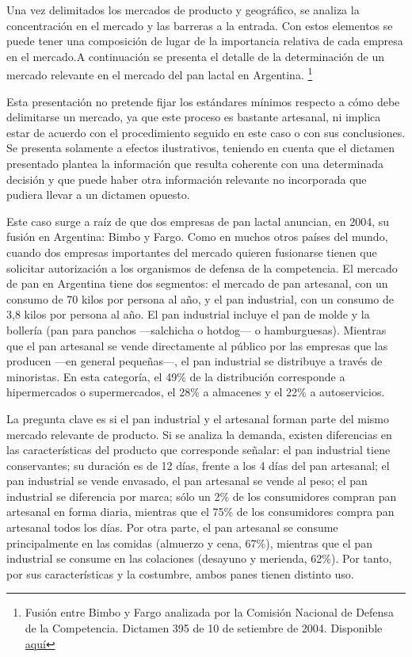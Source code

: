 \documentclass[
  12pt,
  spanish,
]{book}
\begin{document}
Una vez delimitados los mercados de producto y geográfico, se analiza la
concentración en el mercado y las barreras a la entrada. Con estos
elementos se puede tener una composición de lugar de la importancia
relativa de cada empresa en el mercado.A continuación se presenta el
detalle de la determinación de un mercado relevante en el mercado del
pan lactal en Argentina. \footnote{Fusión entre Bimbo y Fargo analizada
  por la Comisión Nacional de Defensa de la Competencia. Dictamen 395 de
  10 de setiembre de 2004. Disponible
  \href{http://cndc.produccion.gob.ar/sites/default/files/cndcfiles/395_0.pdf}{aquí}}

Esta presentación no pretende fijar los estándares mínimos respecto a
cómo debe delimitarse un mercado, ya que este proceso es bastante
artesanal, ni implica estar de acuerdo con el procedimiento seguido en
este caso o con sus conclusiones. Se presenta solamente a efectos
ilustrativos, teniendo en cuenta que el dictamen presentado plantea la
información que resulta coherente con una determinada decisión y que
puede haber otra información relevante no incorporada que pudiera llevar
a un dictamen opuesto.

Este caso surge a raíz de que dos empresas de pan lactal anuncian, en
2004, su fusión en Argentina: Bimbo y Fargo. Como en muchos otros países
del mundo, cuando dos empresas importantes del mercado quieren
fusionarse tienen que solicitar autorización a los organismos de defensa
de la competencia. El mercado de pan en Argentina tiene dos segmentos:
el mercado de pan artesanal, con un consumo de 70 kilos por persona al
año, y el pan industrial, con un consumo de 3,8 kilos por persona al
año. El pan industrial incluye el pan de molde y la bollería (pan para
panchos ---salchicha o hotdog--- o hamburguesas). Mientras que el pan
artesanal se vende directamente al público por las empresas que las
producen ---en general pequeñas---, el pan industrial se distribuye a
través de minoristas. En esta categoría, el 49\% de la distribución
corresponde a hipermercados o supermercados, el 28\% a almacenes y el
22\% a autoservicios.

La pregunta clave es si el pan industrial y el artesanal forman parte
del mismo mercado relevante de producto. Si se analiza la demanda,
existen diferencias en las características del producto que corresponde
señalar: el pan industrial tiene conservantes; su duración es de 12
días, frente a los 4 días del pan artesanal; el pan industrial se vende
envasado, el pan artesanal se vende al peso; el pan industrial se
diferencia por marca; sólo un 2\% de los consumidores compran pan
artesanal en forma diaria, mientras que el 75\% de los consumidores
compra pan artesanal todos los días. Por otra parte, el pan artesanal se
consume principalmente en las comidas (almuerzo y cena, 67\%), mientras
que el pan industrial se consume en las colaciones (desayuno y merienda,
62\%). Por tanto, por sus características y la costumbre, ambos panes
tienen distinto uso.
\end{document}
